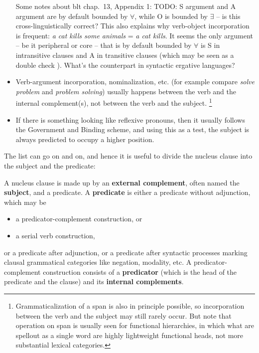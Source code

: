\documentclass[UTF8, a4paper, oneside, scheme=plain]{ctexart}
\newcommand*{\citechap}[1]{chap.~{#1}}
\newcommand*{\concept}[1]{\textbf{#1}}
\newcommand*{\corpus}[1]{\emph{#1}}
\begin{document}
\begin{itemize}
    Some notes about \ac{blt} \citechap{13}, Appendix 1: 
    TODO: S argument and A argument are by default bounded by $\forall$,
    while O is bounded by $\exists$ -- is this cross-linguistically correct?
    This also explains why verb-object incorporation is frequent:
    \corpus{a cat kills some animals} = \corpus{a cat kills}.
    It seems the only argument -- be it peripheral or core -- 
    that is by default bounded by $\forall$ is S in intransitive clauses and A in transitive clauses
    (which may be seen as a double check ).
    What's the counterpart in syntactic ergative languages?
    \item Verb-argument incorporation, nominalization, etc. 
    (for example compare \corpus{solve problem} and \corpus{problem solving}) 
    usually happens between the verb and the internal complement(s),
    not between the verb and the subject.%
    \footnote{
        Grammaticalization of a span is also in principle possible,
        so incorporation between the verb and the subject 
        may still rarely occur.
        But note that operation on span is usually seen for functional hierarchies,
        in which what are spellout as a single word 
        are highly lightweight functional heads, 
        not more substantial lexical categories.
    }
    \item If there is something looking like reflexive pronouns, 
    then it usually follows the Government and Binding scheme,
    and using this as a test,
    the subject is always predicted to occupy a higher position.
\end{itemize}
The list can go on and on, and hence it is useful to divide the nucleus clause into 
the subject and the predicate:
\begin{exe}
    \ex\label{ex:subject-predicate} A nucleus clause is made up by an \concept{external complement}, often named the \concept{subject},
    and a predicate.
    \ex\label{ex:predicate-as-vp} A \concept{predicate} is either a predicate without adjunction, which may be 
    \begin{itemize}
        \item a predicator-complement construction, or 
        \item a serial verb construction, 
    \end{itemize} 
    or a predicate after adjunction,
    or a predicate after syntactic processes marking clausal grammatical categories like 
    negation, modality, etc.
    \ex\label{ex:predicator-complement} A predicator-complement construction consists of 
    a \concept{predicator} (which is the head of the predicate and the clause) 
    and its \concept{internal complements}.
\end{exe}
\end{document}
